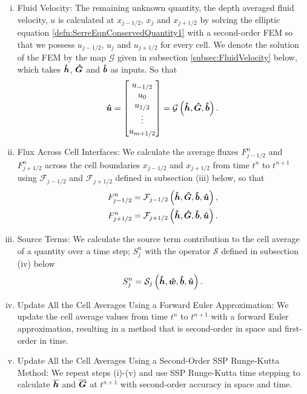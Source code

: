 \begin{enumerate}[(i)]
	\item Fluid Velocity: The remaining unknown quantity, the depth averaged fluid velocity, $u$ is calculated at $x_{j-1/2}$, $x_j$ and $x_{j+1/2}$ by solving the elliptic equation \eqref{defn:SerreEqnConservedQuantity1} with a second-order FEM so that we possess $u_{j-1/2}$, $u_j$ and $u_{j+1/2}$ for every cell. We denote the solution of the FEM by the map $\mathcal{G}$ given in subsection \ref{subsec:FluidVelocity} below, which takes $\boldsymbol{\hat{h}}$, $\boldsymbol{\hat{G}}$ and $\boldsymbol{\hat{b}}$ as inputs. So that
	\begin{equation*}
	\boldsymbol{\hat{u}} = 
	\begin{bmatrix}
	u_{-1/2} \\ u_0 \\ u_{1/2} \\ \vdots \\ u_{m+1/2}
	\end{bmatrix} = \mathcal{G}\left( \boldsymbol{\hat{h}}, \boldsymbol{\hat{G}},\boldsymbol{\hat{b}} \right).
	\end{equation*}
	\item Flux Across Cell Interfaces: We calculate the average fluxes $F^n_{j-1/2}$ and $F^n_{j+1/2}$ across the cell boundaries $x_{j-1/2}$ and $x_{j+1/2}$ from time $t^n$ to $t^{n+1}$ using $\mathcal{F}_{j-1/2}$ and $\mathcal{F}_{j+1/2}$ defined in subsection (iii) below, so that
		\begin{align*}	
		F^n_{j-1/2} &=\mathcal{F}_{j-1/2} \left( \boldsymbol{\hat{h}}, \boldsymbol{\hat{G}},\boldsymbol{\hat{b}}, \boldsymbol{\hat{u}}  \right),\\
		F^n_{j+1/2} &=\mathcal{F}_{j+1/2} \left(\boldsymbol{\hat{h}}, \boldsymbol{\hat{G}},\boldsymbol{\hat{b}}, \boldsymbol{\hat{u}}  \right).
		\end{align*}
	\item Source Terms: We calculate the source term contribution to the cell average of a quantity over a time step; $S^n_{j}$ with the operator $\mathcal{S}$ defined in subsection (iv) below
	\begin{equation*}	
	S^n_{j} =\mathcal{S}_{j} \left( \boldsymbol{\hat{h}},\boldsymbol{\hat{w}},\boldsymbol{\hat{b}}, \boldsymbol{\hat{u}}  \right).
	\end{equation*}
	\item Update All the Cell Averages Using a Forward Euler Approximation: We update the cell average values from time $t^n$ to $t^{n+1}$ with a forward Euler approximation, resulting in a method that is second-order in space and first-order in time.
	\item Update All the Cell Averages Using a Second-Order SSP Runge-Kutta Method: We repeat steps (i)-(v) and use SSP Runge-Kutta time stepping to calculate $\overline{\boldsymbol{h}}$ and $\overline{\boldsymbol{G}}$ at $t^{n+1}$ with second-order accuracy in space and time.
\end{enumerate}

